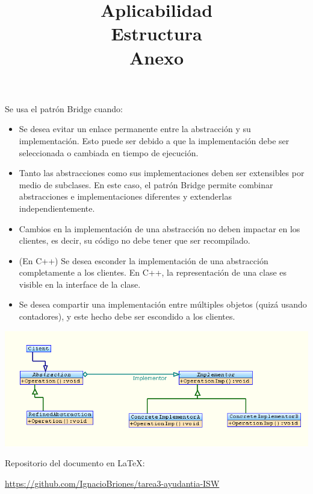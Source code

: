 \documentclass[a4paper,10pt]{report}
\begin{document}
\title{\textbf{Aplicabilidad\\}}


Se usa el patrón Bridge cuando:\\

\begin{itemize}
\item{Se desea evitar un enlace permanente entre la abstracción y su implementación. Esto puede ser debido a que la implementación debe ser seleccionada o cambiada en tiempo de ejecución.}
\item{Tanto las abstracciones como sus implementaciones deben ser extensibles por medio de subclases. En este caso, el patrón Bridge permite combinar abstracciones e implementaciones diferentes y extenderlas independientemente.} 
\item{Cambios en la implementación de una abstracción no deben impactar en los clientes, es decir, su código no debe tener que ser recompilado.}
\item{(En C++) Se desea esconder la implementación de una abstracción completamente a los clientes. En C++, la representación de una clase es visible en la interface de la clase.}
\item{Se desea compartir una implementación entre múltiples objetos (quizá usando contadores), y este hecho debe ser escondido a los clientes.\\}
\end{itemize}

\title{\textbf{Estructura\\}}

\includegraphics[scale=1]{Bridge.png} 

\title{\textbf{Anexo\\}}

Repositorio del documento en \LaTeX:

\url{https://github.com/IgnacioBriones/tarea3-ayudantia-ISW}
\end{document}
